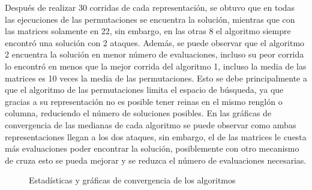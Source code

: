 \documentclass[runningheads]{llncs}
\begin{document}
Después de realizar 30 corridas de cada representación, se obtuvo que en todas las ejecuciones de las permutaciones se encuentra la solución, mientras que con las matrices solamente en 22, sin embargo, en las otras 8 el algoritmo siempre encontró una solución con 2 ataques. Además, se puede observar que el algoritmo 2 encuentra la solución en menor número de evaluaciones, incluso su peor corrida lo encontró en menos que la mejor corrida del algoritmo 1, incluso la media de las matrices es 10 veces la media de las permutaciones. Esto se debe principalmente a que el algoritmo de las permutaciones limita el espacio de búsqueda, ya que gracias a su representación no es posible tener reinas en el mismo renglón o columna, reduciendo el número de soluciones posibles. En las gráficas de convergencia de las medianas de cada algoritmo se puede observar como ambas representaciones llegan a los dos ataques, sin embargo, el de las matrices le cuesta más evaluaciones poder encontrar la solución, posiblemente con otro mecanismo de cruza esto se pueda mejorar y se reduzca el número de evaluaciones necesarias.

\begin{figure}
\caption{Estadísticas y gráficas de convergencia de los algoritmos} \label{Estadisticas}
\end{figure}
\end{document}
